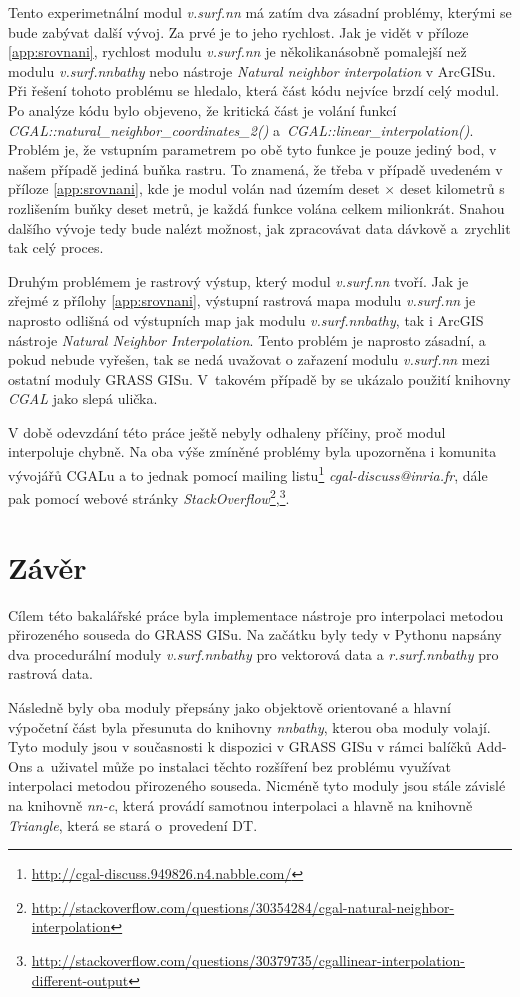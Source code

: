 \documentclass[12pt,a4paper]{article}
\newcommand{\necislovana}[1]{%
\phantomsection
\addcontentsline{toc}{section}{#1}



\section*{#1}
\markboth{\uppercase{#1}}{}
}
\begin{document}
Tento experimetnální modul \emph{v.surf.nn} má zatím dva zásadní problémy,
kterými se bude zabývat další vývoj. Za prvé je to jeho rychlost. 
Jak je vidět v příloze \ref{app:srovnani}, rychlost modulu \emph{v.surf.nn} je 
několikanásobně pomalejší než modulu \emph{v.surf.nnbathy} nebo nástroje 
\emph{Natural neighbor interpolation} v ArcGISu. Při řešení tohoto problému se hledalo, 
která část kódu nejvíce brzdí celý modul. Po analýze kódu bylo objeveno, 
že kritická část je volání funkcí \emph{CGAL::natural\_neighbor\_coordinates\_2()} a~\emph{CGAL::linear\_interpolation()}. Problém je, že vstupním parametrem po obě tyto 
 funkce je pouze jediný bod, v našem případě jediná buňka rastru. To znamená, že 
třeba v případě uvedeném v příloze \ref{app:srovnani}, kde je modul volán nad územím 
deset $\times$ deset kilometrů s rozlišením buňky deset metrů, je každá funkce volána
celkem milionkrát. Snahou dalšího vývoje tedy bude nalézt možnost, jak zpracovávat 
data dávkově a~zrychlit tak celý proces.

Druhým problémem je rastrový výstup, který modul \emph{v.surf.nn} tvoří. Jak je zřejmé 
z přílohy \ref{app:srovnani}, výstupní rastrová mapa modulu \emph{v.surf.nn} je naprosto 
odlišná od výstupních map jak modulu \emph{v.surf.nnbathy}, tak i ArcGIS nástroje 
\emph{Natural Neighbor Interpolation}. Tento problém je naprosto zásadní, a pokud nebude vyřešen,
tak se nedá uvažovat o zařazení modulu \emph{v.surf.nn} mezi ostatní moduly GRASS GISu. 
V~takovém případě by se ukázalo použití knihovny \emph{CGAL} jako slepá ulička.

V době odevzdání této práce ještě nebyly odhaleny příčiny, proč modul interpoluje chybně.
Na oba výše zmíněné problémy byla upozorněna i komunita vývojářů CGALu a to jednak pomocí 
mailing listu\footnote{\url{http://cgal-discuss.949826.n4.nabble.com/}} \emph{cgal-discuss@inria.fr}, dále pak pomocí webové stránky
\emph{StackOverflow}\footnote{\url{http://stackoverflow.com/questions/30354284/cgal-natural-neighbor-interpolation}},\footnote{\url{http://stackoverflow.com/questions/30379735/cgallinear-interpolation-different-output}}.


\newpage
\necislovana{Závěr}

Cílem této bakalářské práce byla implementace nástroje pro interpolaci
metodou přirozeného souseda do GRASS GISu. Na začátku byly tedy v
Pythonu napsány dva procedurální moduly \emph{v.surf.nnbathy} pro vektorová data a
\emph{r.surf.nnbathy} pro rastrová data.

Následně byly oba moduly přepsány jako objektově orientované a 
hlavní výpočetní část byla přesunuta do knihovny \emph{nnbathy}, 
kterou oba moduly volají. Tyto moduly jsou v
současnosti k dispozici v GRASS GISu v rámci balíčků Add-Ons a~uživatel může po instalaci těchto rozšíření bez problému využívat
interpolaci metodou přirozeného souseda. Nicméně tyto moduly jsou
stále závislé na knihovně \emph{nn-c}, která provádí samotnou
interpolaci a hlavně na knihovně \emph{Triangle}, která se stará 
o~provedení DT.
\end{document}

